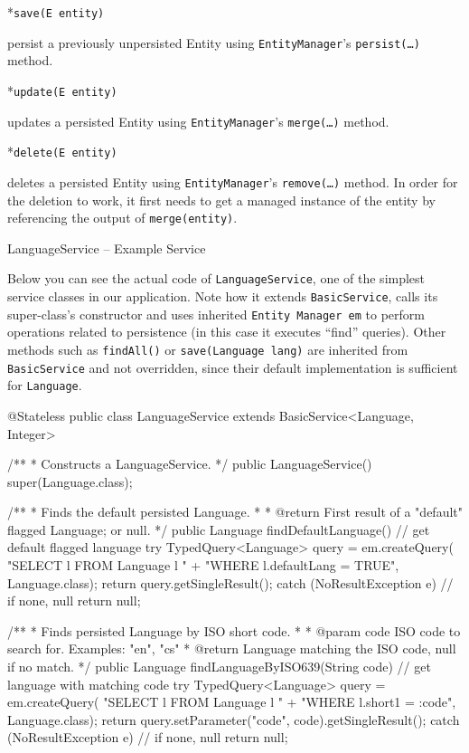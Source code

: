 *{\tt save(E entity)}

persist a previously unpersisted Entity using {\tt EntityManager}’s {\tt persist(…)} method.

*{\tt update(E entity)}

updates a persisted Entity using {\tt EntityManager}’s {\tt merge(…)} method.

*{\tt delete(E entity)}

deletes a persisted Entity using {\tt EntityManager}’s {\tt remove(…)} method. In order for the deletion to work, it first needs to get a managed instance of the entity by referencing the output of {\tt merge(entity)}.

\enditems

\secc LanguageService -- Example Service

Below you can see the actual code of {\tt LanguageService}, one of the simplest service classes in our application. Note how it extends {\tt BasicService}, calls its super-class’s constructor and uses inherited {\tt Entity Manager em} to perform operations related to persistence (in this case it executes “find” queries). Other methods such as {\tt findAll()} or {\tt save(Language lang)} are inherited from {\tt BasicService} and not overridden, since their default implementation is sufficient for {\tt Language}.

\vfil \break

\begtt

@Stateless
public class LanguageService extends BasicService<Language, Integer> {

    /**
     * Constructs a LanguageService.
     */
    public LanguageService() {
        super(Language.class);
    }
    
    /**
     * Finds the default persisted Language.
     *
     * @return First result of a "default" flagged Language; or null.
     */
    public Language findDefaultLanguage() {
        // get default flagged language
        try {
            TypedQuery<Language> query = em.createQuery(
                    "SELECT l FROM Language l "
                            + "WHERE l.defaultLang = TRUE",
                    Language.class);
            return query.getSingleResult();
        } catch (NoResultException e) {
            // if none, null
            return null;
        }
    }
    
    /**
     * Finds persisted Language by ISO short code.
     *
     * @param code ISO code to search for. Examples: "en", "cs"
     * @return Language matching the ISO code, null if no match.
     */
    public Language findLanguageByISO639(String code) {
        // get language with matching code
        try {
            TypedQuery<Language> query = em.createQuery(
                    "SELECT l FROM Language l "
                            + "WHERE l.short1 = :code",
                    Language.class);
            return query.setParameter("code", code).getSingleResult();
        } catch (NoResultException e) {
            // if none, null
            return null;
        }
    }
}
\endtt

